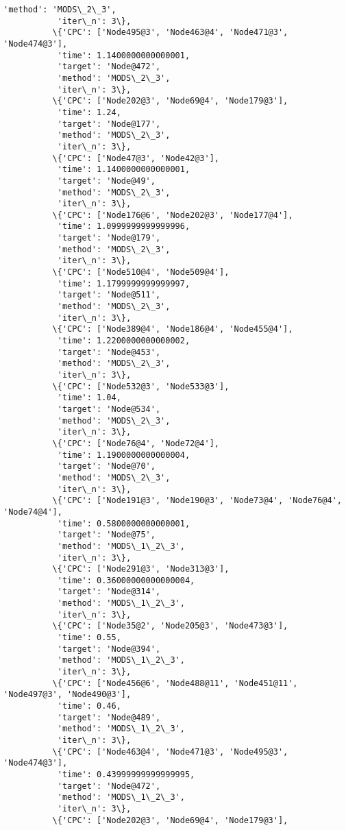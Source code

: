 \documentclass[11pt]{article}
\begin{document}
\begin{Verbatim}[commandchars=\\\{\}]
           'method': 'MODS\_2\_3',
           'iter\_n': 3\},
          \{'CPC': ['Node495@3', 'Node463@4', 'Node471@3', 'Node474@3'],
           'time': 1.1400000000000001,
           'target': 'Node@472',
           'method': 'MODS\_2\_3',
           'iter\_n': 3\},
          \{'CPC': ['Node202@3', 'Node69@4', 'Node179@3'],
           'time': 1.24,
           'target': 'Node@177',
           'method': 'MODS\_2\_3',
           'iter\_n': 3\},
          \{'CPC': ['Node47@3', 'Node42@3'],
           'time': 1.1400000000000001,
           'target': 'Node@49',
           'method': 'MODS\_2\_3',
           'iter\_n': 3\},
          \{'CPC': ['Node176@6', 'Node202@3', 'Node177@4'],
           'time': 1.0999999999999996,
           'target': 'Node@179',
           'method': 'MODS\_2\_3',
           'iter\_n': 3\},
          \{'CPC': ['Node510@4', 'Node509@4'],
           'time': 1.1799999999999997,
           'target': 'Node@511',
           'method': 'MODS\_2\_3',
           'iter\_n': 3\},
          \{'CPC': ['Node389@4', 'Node186@4', 'Node455@4'],
           'time': 1.2200000000000002,
           'target': 'Node@453',
           'method': 'MODS\_2\_3',
           'iter\_n': 3\},
          \{'CPC': ['Node532@3', 'Node533@3'],
           'time': 1.04,
           'target': 'Node@534',
           'method': 'MODS\_2\_3',
           'iter\_n': 3\},
          \{'CPC': ['Node76@4', 'Node72@4'],
           'time': 1.1900000000000004,
           'target': 'Node@70',
           'method': 'MODS\_2\_3',
           'iter\_n': 3\},
          \{'CPC': ['Node191@3', 'Node190@3', 'Node73@4', 'Node76@4', 'Node74@4'],
           'time': 0.5800000000000001,
           'target': 'Node@75',
           'method': 'MODS\_1\_2\_3',
           'iter\_n': 3\},
          \{'CPC': ['Node291@3', 'Node313@3'],
           'time': 0.36000000000000004,
           'target': 'Node@314',
           'method': 'MODS\_1\_2\_3',
           'iter\_n': 3\},
          \{'CPC': ['Node35@2', 'Node205@3', 'Node473@3'],
           'time': 0.55,
           'target': 'Node@394',
           'method': 'MODS\_1\_2\_3',
           'iter\_n': 3\},
          \{'CPC': ['Node456@6', 'Node488@11', 'Node451@11', 'Node497@3', 'Node490@3'],
           'time': 0.46,
           'target': 'Node@489',
           'method': 'MODS\_1\_2\_3',
           'iter\_n': 3\},
          \{'CPC': ['Node463@4', 'Node471@3', 'Node495@3', 'Node474@3'],
           'time': 0.43999999999999995,
           'target': 'Node@472',
           'method': 'MODS\_1\_2\_3',
           'iter\_n': 3\},
          \{'CPC': ['Node202@3', 'Node69@4', 'Node179@3'],

\end{Verbatim}
\end{document}

